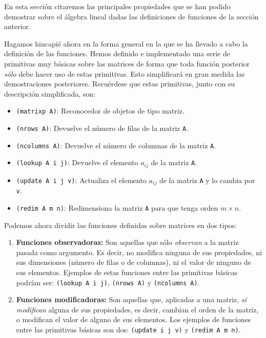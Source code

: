 \documentclass[a4paper,10pt]{article}
\begin{document}
\par \vspace{10pt}

En esta sección citaremos las principales propiedades que se han podido demostrar sobre el álgebra lineal dadas las definiciones de funciones de la sección anterior.

\par \vspace{10pt}

Hagamos hincapié ahora en la forma general en la que se ha llevado a cabo la definición de las funciones. Hemos definido e implementado una serie de primitivas muy básicas sobre las matrices de forma que toda función posterior \emph{sólo} debe hacer uso de estas primitivas. Esto simplificará en gran medida las demostraciones posteriores. Recuérdese que estas primitivas, junto con su descripción simplificada, son:

\par \vspace{10pt}

\begin{itemize}
	\item \texttt{(matrixp A)}: Reconocedor de objetos de tipo matriz.
	\item \texttt{(nrows A)}: Devuelve el número de filas de la matriz \texttt{A}.
	\item \texttt{(ncolumns A)}: Devuelve el número de columnas de la matriz \texttt{A}.
	\item \texttt{(lookup A i j)}: Devuelve el elemento $a_{ij}$ de la matriz \texttt{A}.
	\item \texttt{(update A i j v)}: Actualiza el elemento $a_{ij}$ de la matriz \texttt{A} y lo cambia por \texttt{v}.
	\item \texttt{(redim A m n)}: Redimensiona la matriz \texttt{A} para que tenga orden $m \times n$.
\end{itemize}

\par \vspace{10pt}

Podemos ahora dividir las funciones definidas sobre matrices en dos tipos:

\par \vspace{10pt}
\begin{enumerate}
	\item \textbf{Funciones observadoras:} Son aquellas que sólo \emph{observan} a la matriz pasada como argumento. Es decir, no modifica ninguna de sus propiedades, ni sus dimensiones (número de filas o de columnas), ni el valor de ninguno de sus elementos. Ejemplos de estas funciones entre las primitivas básicas podrían ser: \texttt{(lookup A i j)}, \texttt{(nrows A)} y \texttt{(ncolumns A)}. 
	\item \textbf{Funciones modificadoras:} Son aquellas que, aplicadas a una matriz, \emph{sí modifican} alguna de sus propiedades, es decir, cambian el orden de la matriz, o modifican el valor de alguno de sus elementos. Los ejemplos de funciones entre las primitivas básicas son dos: \texttt{(update i j v)} y \texttt{(redim A m n)}.
\end{enumerate}
\end{document}
